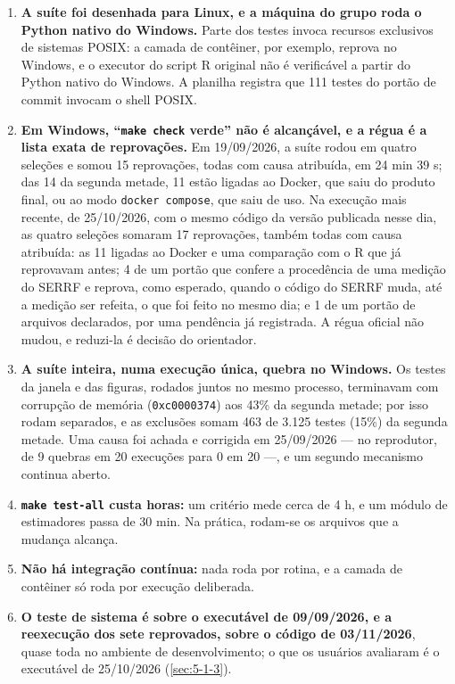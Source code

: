 \begin{enumerate}
\item \textbf{A suíte foi desenhada para Linux, e a máquina do grupo roda o Python nativo do Windows.} Parte dos testes invoca recursos exclusivos de sistemas POSIX: a camada de contêiner, por exemplo, reprova no Windows, e o executor do script R original não é verificável a partir do Python nativo do Windows. A planilha registra que 111 testes do portão de commit invocam o shell POSIX.
\item \textbf{Em Windows, ``\texttt{make check} verde'' não é alcançável, e a régua é a lista exata de reprovações.} Em 19/09/2026, a suíte rodou em quatro seleções e somou 15 reprovações, todas com causa atribuída, em 24 min 39 s; das 14 da segunda metade, 11 estão ligadas ao Docker, que saiu do produto final, ou ao modo \texttt{docker compose}, que saiu de uso. Na execução mais recente, de 25/10/2026, com o mesmo código da versão publicada nesse dia, as quatro seleções somaram 17 reprovações, também todas com causa atribuída: as 11 ligadas ao Docker e uma comparação com o R que já reprovavam antes; 4 de um portão que confere a procedência de uma medição do SERRF e reprova, como esperado, quando o código do SERRF muda, até a medição ser refeita, o que foi feito no mesmo dia; e 1 de um portão de arquivos declarados, por uma pendência já registrada. A régua oficial não mudou, e reduzi-la é decisão do orientador.
\item \textbf{A suíte inteira, numa execução única, quebra no Windows.} Os testes da janela e das figuras, rodados juntos no mesmo processo, terminavam com corrupção de memória (\texttt{0xc0000374}) aos 43\% da segunda metade; por isso rodam separados, e as exclusões somam 463 de 3.125 testes (15\%) da segunda metade. Uma causa foi achada e corrigida em 25/09/2026 --- no reprodutor, de 9 quebras em 20 execuções para 0 em 20 ---, e um segundo mecanismo continua aberto.
\item \textbf{\texttt{make test-\allowbreak{}all} custa horas:} um critério mede cerca de 4 h, e um módulo de estimadores passa de 30 min. Na prática, rodam-se os arquivos que a mudança alcança.
\item \textbf{Não há integração contínua:} nada roda por rotina, e a camada de contêiner só roda por execução deliberada.
\item \textbf{O teste de sistema é sobre o executável de 09/09/2026, e a reexecução dos sete reprovados, sobre o código de 03/11/2026}, quase toda no ambiente de desenvolvimento; o que os usuários avaliaram é o executável de 25/10/2026 (\ref{sec:5-1-3}).

\end{enumerate}
